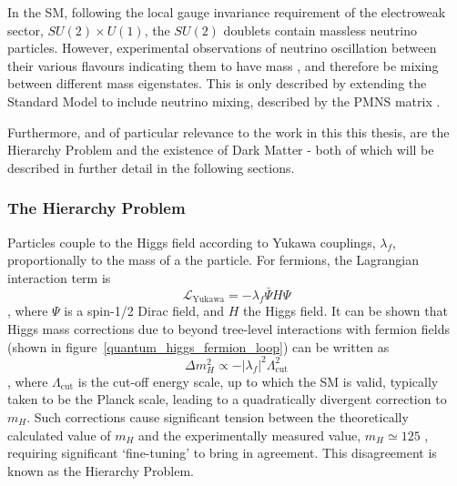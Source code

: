 In the SM, following the local gauge invariance requirement of the electroweak
sector, $SU(2)\times U(1)$, the $SU(2)$ doublets contain
massless neutrino particles. However, experimental observations of neutrino
oscillation between their various flavours indicating them to have mass
\cite{PhysRevLett.81.1562,PhysRevLett.89.011302}, and
therefore be mixing between different mass eigenstates. This is only described
by extending the Standard Model to include neutrino mixing, described by the
PMNS matrix \cite{Altarelli:2002hx}.

Furthermore, and of particular relevance to the work in this this thesis, are
the Hierarchy Problem and the existence of Dark Matter - both of which will be
described in further detail in the following sections.

\subsubsection{The Hierarchy Problem}


Particles couple to the Higgs field according to Yukawa couplings, $\lambda_f$,
proportionally to the mass of a the particle. For fermions, the Lagrangian
interaction term is
% 
\begin{equation}
\mathcal{L}_\text{Yukawa} = - \lambda_f \bar{\Psi}H\Psi
\end{equation},
% 
where $\Psi$ is a spin-1/2 Dirac field, and $H$ the Higgs field. It can be shown
that Higgs mass corrections due to beyond tree-level interactions with fermion
fields (shown in figure~\ref{quantum_higgs_fermion_loop}) can be written as
% 
\begin{equation}
\Delta m_H^2 \propto -|\lambda_f|^2 \Lambda_{\text{cut}}^2
\label{eq:higgs_corr_hierarchy}
\end{equation},
% 
where $\Lambda_{\text{cut}}$ is the cut-off energy scale, up to which the SM is
valid, typically taken to be the Planck scale, leading to a quadratically
divergent correction to $m_H$. Such corrections cause significant tension
between the theoretically calculated value of $m_H$ and the experimentally
measured value, $m_H \simeq 125$ \gev \cite{Chatrchyan:2012ufa, Aad:2012tfa},
requiring significant `fine-tuning' to bring in agreement. This disagreement is
known as the Hierarchy Problem.

